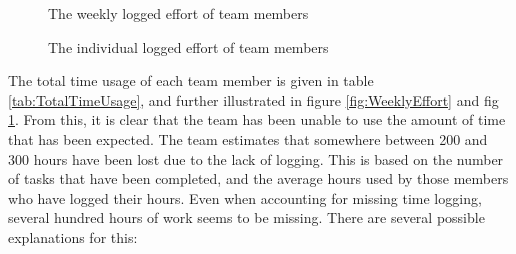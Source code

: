 \documentclass[11pt,a4paper,titlepage,oneside]{report}
\begin{document}
\begin{figure}[ht!]
\begin{center}
\caption{The weekly logged effort of team members}
\label{fig:WeeklyEffort}
\caption{The individual logged effort of team members}
\label{fig:IndividualEffort}
\end{center}
\end{figure}



The total time usage of each team member is given in table \ref{tab:TotalTimeUsage}, and further illustrated in figure \ref{fig:WeeklyEffort} and fig \ref{fig:IndividualEffort}. From this, it is clear that the team has been unable to use the amount of time that has been expected. The team estimates that somewhere between 200 and 300 hours have been lost due to the lack of logging. This is based on the number of tasks that have been completed, and the average hours used by those members who have logged their hours. Even when accounting for missing time logging, several hundred hours of work seems to be missing. There are several possible explanations for this:
\end{document}
